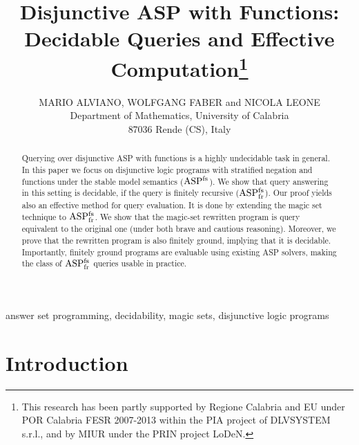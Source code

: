\documentclass{tlp}
\newcommand{\ASPFN}{\ensuremath{\rm ASP^{\rm fs}}}
\newcommand{\ASPFNFR}{\ensuremath{\rm ASP^{\rm fs}_{\rm fr}}}
\begin{document}



\title[Disjunctive ASP with Functions: Decidable Queries and Effective Computation\ \ \ \ ]
    {Disjunctive ASP with Functions:\\ Decidable Queries and Effective Computation\thanks{This research has been partly supported by Regione Calabria and EU
under POR Calabria FESR 2007-2013 within the PIA
project of DLVSYSTEM s.r.l., and by MIUR under the PRIN project LoDeN. }
}


\author[M. Alviano, W. Faber and N. Leone]
{MARIO ALVIANO, WOLFGANG FABER and NICOLA LEONE\\
Department of Mathematics, University of Calabria \\
87036 Rende (CS), Italy\\
}

\date{}


\maketitle

\label{firstpage}

\begin{abstract}
Querying over disjunctive ASP with functions is a
highly undecidable task in general.
In this paper we focus on disjunctive logic programs with stratified
negation and functions under the stable model semantics (\ASPFN). We show that
query answering in this setting is decidable, if the query is
finitely recursive (\ASPFNFR).
Our proof yields also an effective method for query evaluation.  It is
done by extending the magic set technique to \ASPFNFR{}.  We show that
the magic-set rewritten program is query equivalent to the original
one (under both brave and cautious reasoning).
Moreover, we prove that the rewritten program is also finitely ground,
implying that it is decidable.  Importantly, finitely ground programs
are evaluable using existing ASP solvers, making the class of \ASPFNFR{} queries usable in practice.
\end{abstract}

\begin{keywords}
 answer set programming, decidability, magic sets, disjunctive logic programs
\end{keywords}

\section{Introduction}
\end{document}
